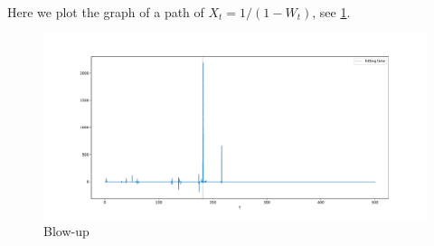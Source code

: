 \documentclass{homework}
\begin{document}
    \problem
    Here we plot the graph of a path of $X_t=1/(1-W_t)$, see \cref{fig:blowup}.
    \begin{figure}[h]
        \centering
        \includegraphics[width=\textwidth]{blowup}
        \caption{Blow-up}
        \label{fig:blowup}
    \end{figure}
\end{document}
